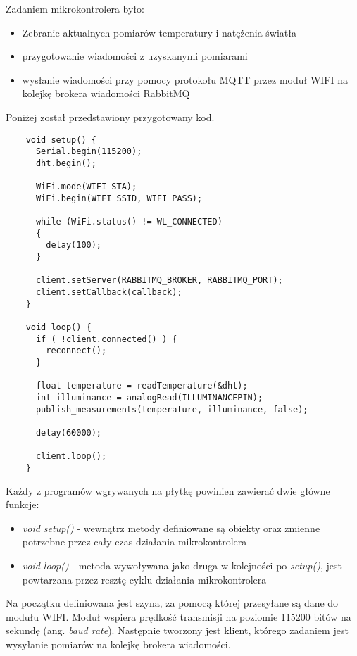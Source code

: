Zadaniem mikrokontrolera było:

\begin{itemize} %
    \item Zebranie aktualnych pomiarów temperatury i natężenia światła
    \item przygotowanie wiadomości z uzyskanymi pomiarami
    \item wysłanie wiadomości przy pomocy protokołu MQTT przez moduł WIFI na 
    kolejkę brokera wiadomości RabbitMQ
\end{itemize}

Poniżej został przedstawiony przygotowany kod.

\begin{lstlisting}
    void setup() {
      Serial.begin(115200);
      dht.begin();
     
      WiFi.mode(WIFI_STA);
      WiFi.begin(WIFI_SSID, WIFI_PASS);
     
      while (WiFi.status() != WL_CONNECTED)
      {
        delay(100);
      }
      
      client.setServer(RABBITMQ_BROKER, RABBITMQ_PORT);
      client.setCallback(callback);
    }
     
    void loop() {
      if ( !client.connected() ) {
        reconnect();
      }
      
      float temperature = readTemperature(&dht);
      int illuminance = analogRead(ILLUMINANCEPIN);
      publish_measurements(temperature, illuminance, false);
      
      delay(60000);
    
      client.loop();
    }
\end{lstlisting}

Każdy z programów wgrywanych na płytkę powinien zawierać dwie główne funkcje:

\begin{itemize}
    \item \textit{void setup()} - wewnątrz metody definiowane są obiekty oraz zmienne 
    potrzebne przez cały czas działania mikrokontrolera
    \item \textit{void loop()} - metoda wywoływana jako druga w kolejności po \textit{setup()},
    jest powtarzana przez resztę cyklu działania mikrokontrolera 
\end{itemize}

Na początku definiowana jest szyna, za pomocą której przesyłane są dane do 
modułu WIFI. Moduł wspiera prędkość transmisji na poziomie 115200 bitów na 
sekundę (ang. \textit{baud rate}). Następnie tworzony jest klient, którego zadaniem
jest wysyłanie pomiarów na kolejkę brokera wiadomości. 

